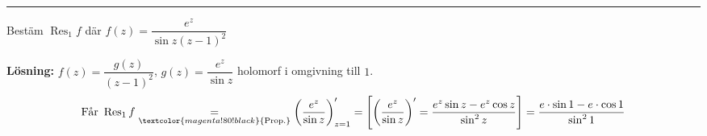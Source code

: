 \noindent\rule{\linewidth}{0.4pt}

\begin{example}
Bestäm $\operatorname{Res}_1 f$ där $f(z) = \dfrac{e^z}{\sin z(z - 1)^2}$

\textbf{Lösning:} $f(z) = \dfrac{g(z)}{(z - 1)^2}$, $g(z) = \dfrac{e^z}{\sin z}$ holomorf i omgivning till $1$.
\[ \text{Får } \operatorname{Res}_1 f \underset{\textcolor{magenta!80!black}{\text{Prop.}}}{=} \left( \frac{e^z}{\sin z} \right)'_{z = 1} = \left[ \left( \frac{e^z}{\sin z} \right)' = \frac{e^z \sin z - e^z \cos z}{\sin^2 z} \right] = \frac{e \cdot \sin 1 - e \cdot \cos 1}{\sin^2 1} \]
\end{example}
